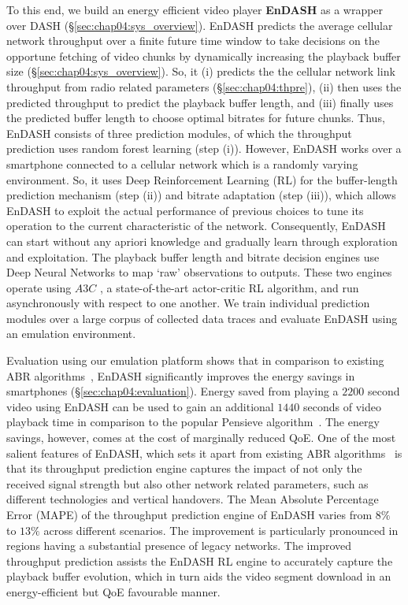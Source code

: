 \indent To this end, we build an energy
efficient video player {\bf EnDASH} as a wrapper over \ac{DASH} (\S\ref{sec:chap04:sys_overview}).
EnDASH predicts the average cellular network throughput over a finite future time window to take decisions on the opportune fetching of video chunks by dynamically increasing the playback buffer size (\S\ref{sec:chap04:sys_overview}). So, it (i) predicts the the cellular network link throughput from radio related parameters (\S\ref{sec:chap04:thpre}), (ii) then uses the predicted throughput to predict the playback buffer length, and (iii) finally uses the predicted buffer length to choose optimal bitrates for future chunks. Thus, EnDASH consists of three prediction modules, of which the throughput prediction uses random forest learning (step (i)). However, EnDASH works over a smartphone connected to a cellular network which is a randomly varying environment. So, it uses Deep Reinforcement Learning (RL) for the buffer-length prediction mechanism (step (ii)) and bitrate adaptation (step (iii)), which allows EnDASH to exploit the actual performance of previous choices to tune its operation to the current characteristic of the network.  Consequently, EnDASH can start without any apriori knowledge and gradually learn through exploration and exploitation.  The playback buffer length and bitrate decision engines use Deep Neural Networks to map `raw' observations to outputs. These two engines operate using $A3C$ \cite{mao2017neural}, a state-of-the-art actor-critic RL algorithm, and run asynchronously with respect to one another. We train individual prediction modules over a large corpus of collected data traces and evaluate EnDASH using an emulation environment.


\indent Evaluation using our emulation platform shows that in comparison to existing \ac{ABR} algorithms~\cite{mao2017neural,Spiteri2016,yin2015control}, EnDASH significantly improves the energy savings in smartphones (\S\ref{sec:chap04:evaluation}). Energy saved from playing a $2200$ second video using EnDASH can be used to gain an additional $1440$ seconds of video playback time in comparison to the popular Pensieve algorithm~\cite{mao2017neural}. The energy savings, however, comes at the cost of marginally reduced \ac{QoE}.
One of the most salient features of EnDASH, which sets it apart from existing \ac{ABR} algorithms~\cite{mao2017neural,Spiteri2016,Sengupta2018,yin2015control,Raca2019,Akhtar2018,Schulman2010} is that its throughput prediction engine captures the impact of not only the received signal strength but also other network related parameters, such as different technologies and vertical handovers. 
The Mean Absolute Percentage Error (MAPE) of the throughput prediction engine of EnDASH varies from $8\%$ to $13\%$ across different scenarios. The improvement is particularly pronounced in regions having a substantial presence of legacy networks.
The improved throughput prediction assists the EnDASH RL engine to accurately capture the playback buffer evolution, which in turn aids the video segment download in an energy-efficient but QoE favourable manner.\vspace*{-0.2cm}
